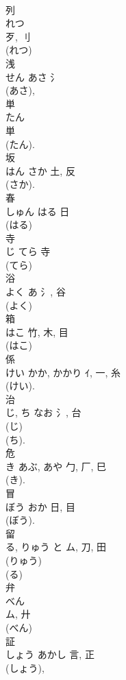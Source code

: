 \documentclass[8pt]{extreport}
\begin{document}
\begin{CJK}{UTF8}{min}
\\	列	
\\	れつ	
\\	歹, 刂	
\\	(れつ) 
\\	浅	
\\	せん	あさ	氵		
\\	(あさ), 
\\	単	
\\	たん	
\\	単	
\\	(たん). 
\\	坂	
\\	はん	さか	土, 反	
\\	(さか). 
\\	春	
\\	しゅん	はる	日		
\\	(はる) 
\\	寺	
\\	じ	てら	寺	
\\	(てら) 
\\	浴	
\\	よく	あ	氵, 谷	
\\	(よく) 
\\	箱	
\\	はこ	竹, 木, 目	
\\	(はこ) 
\\	係	
\\	けい	かか, かかり	ｲ, 一, 糸	
\\	(けい). 
\\	治	
\\	じ, ち	なお	氵, 台	
\\	(じ) 
\\	(ち). 
\\	危	
\\	き	あぶ, あや	勹, 厂, 巳	
\\	(き). 
\\	冒	
\\	ぼう	おか	日, 目	
\\	(ぼう). 
\\	留	
\\	る, りゅう	と	ム, 刀, 田	
\\	(りゅう) 
\\	(る) 
\\	弁	
\\	べん	
\\	ム, 廾	
\\	(べん) 
\\	証	
\\	しょう	あかし	言, 正	
\\	(しょう), 

\end{CJK}
\end{document}
